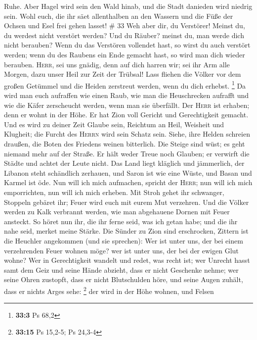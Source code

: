Ruhe.  Aber Hagel wird sein den Wald hinab, und die Stadt
danieden wird niedrig sein.  Wohl euch, die ihr säet
allenthalben an den Wassern und die Füße der Ochsen und Esel frei gehen
lasset! \# 33  Weh aber dir, du Verstörer! Meinst du, du
werdest nicht verstört werden? Und du Räuber? meinst du, man werde dich
nicht berauben? Wenn du das Verstören vollendet hast, so wirst du auch
verstört werden; wenn du des Raubens ein Ende gemacht hast, so wird man
dich wieder berauben.  \textsc{Herr}, sei uns gnädig, denn
auf dich harren wir; sei ihr Arm alle Morgen, dazu unser Heil zur Zeit
der Trübsal!  Lass fliehen die Völker vor dem großen
Getümmel und die Heiden zerstreut werden, wenn du dich erhebst.
\footnote{\textbf{33:3} Ps 68,2}  Da wird man euch
aufraffen wie einen Raub, wie man die Heuschrecken aufrafft und wie die
Käfer zerscheucht werden, wenn man sie überfällt.  Der
\textsc{Herr} ist erhaben; denn er wohnt in der Höhe. Er hat Zion voll
Gericht und Gerechtigkeit gemacht.  Und es wird zu deiner
Zeit Glaube sein, Reichtum an Heil, Weisheit und Klugheit; die Furcht
des \textsc{Herrn} wird sein Schatz sein.  Siehe, ihre
Helden schreien draußen, die Boten des Friedens weinen bitterlich.
 Die Steige sind wüst; es geht niemand mehr auf der
Straße. Er hält weder Treue noch Glauben; er verwirft die Städte und
achtet der Leute nicht.  Das Land liegt kläglich und
jämmerlich, der Libanon steht schändlich zerhauen, und Saron ist wie
eine Wüste, und Basan und Karmel ist öde.  Nun will ich
mich aufmachen, spricht der \textsc{Herr}; nun will ich mich
emporrichten, nun will ich mich erheben.  Mit Stroh gehet
ihr schwanger, Stoppeln gebäret ihr; Feuer wird euch mit eurem Mut
verzehren.  Und die Völker werden zu Kalk verbrannt
werden, wie man abgehauene Dornen mit Feuer ansteckt.  So
höret nun ihr, die ihr ferne seid, was ich getan habe; und die ihr nahe
seid, merket meine Stärke.  Die Sünder zu Zion sind
erschrocken, Zittern ist die Heuchler angekommen (und sie sprechen): Wer
ist unter uns, der bei einem verzehrenden Feuer wohnen möge? wer ist
unter uns, der bei der ewigen Glut wohne?  Wer in
Gerechtigkeit wandelt und redet, was recht ist; wer Unrecht hasst samt
dem Geiz und seine Hände abzieht, dass er nicht Geschenke nehme; wer
seine Ohren zustopft, dass er nicht Blutschulden höre, und seine Augen
zuhält, dass er nichts Arges sehe: \footnote{\textbf{33:15} Ps 15,2-5;
  Ps 24,3-4}  der wird in der Höhe wohnen, und Felsen
